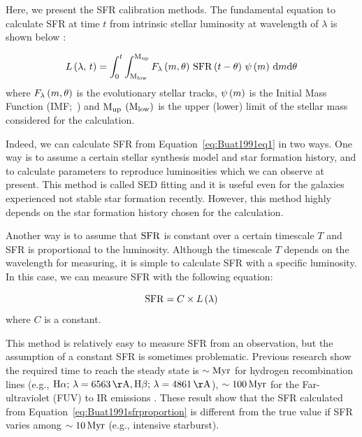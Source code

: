Here, we present the SFR calibration methods.
The fundamental equation to calculate SFR at time $t$ from intrinsic stellar luminosity at wavelength of $\lambda$ is shown below \citep{Buat1991}:

\begin{equation}\label{eq:Buat1991eq1}
    L\left(\lambda,\,t\right)=\int_{0}^{t} \int_{\mathrm{M}_{\mathrm{low}}}^{\mathrm{M}_{\mathrm{up}}} F_{\lambda}\left(m, \theta\right)\,\mathrm{SFR}\left(t-\theta\right)\,\psi\left(m\right)\,\mathrm{d}m \mathrm{d} \theta
\end{equation}
where $F_{\lambda}\left(m, \theta\right)$ is the evolutionary stellar tracks, $\psi\left(m\right)$ is the Initial Mass Function (IMF;~\citealt{Salpeter1955, Kroupa2001, Chabrier2003}) and $\mathrm{M}_{\mathrm{up}}$ $\left(\mathrm{M}_{\mathrm{low}}\right)$ is the upper (lower) limit of the stellar mass considered for the calculation.

Indeed, we can calculate SFR from Equation~\ref{eq:Buat1991eq1} in two ways.
One way is to assume a certain stellar synthesis model and star formation history, and to calculate parameters to reproduce luminosities which we can observe at present.
This method is called SED fitting and it is useful even for the galaxies experienced not stable star formation recently.
However, this method highly depends on the star formation history chosen for the calculation.

Another way is to assume that $\mathrm{SFR}$ is constant over a certain timescale $T$ and SFR is proportional to the luminosity.
Although the timescale $T$ depends on the wavelength for measuring, it is simple to calculate SFR with a specific luminosity.
In this case, we can measure SFR with the following equation:

\begin{equation}\label{eq:Buat1991sfrproportion}
    \mathrm{SFR} = C \times L\left(\lambda\right)
\end{equation}
where $C$ is a constant.

This method is relatively easy to measure SFR from an observation, but the assumption of a constant SFR is sometimes problematic.
Previous research show the required time to reach the steady state is $\sim\mathrm{Myr}$ for hydrogen recombination lines (e.g., $\mr{H\alpha};\,\lambda = 6563\,\mr{\AA}, \mr{H\beta};\,\lambda = 4861\,\mr{\AA}$), $\sim 100\,\mathrm{Myr}$ for the Far-ultraviolet (FUV) to IR emissions \citep{Hao2011, Murphy2011, Kennicutt2012}.
These result show that the SFR calculated from Equation~\ref{eq:Buat1991sfrproportion} is different from the true value if SFR varies among $\sim 10\,\mathrm{Myr}$ (e.g., intensive starburst).

